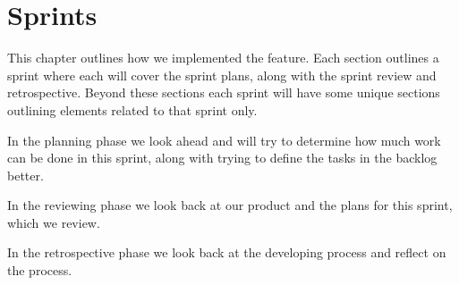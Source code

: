 \chapter{Sprints}
This chapter outlines how we implemented the feature. Each section outlines a sprint where each will cover the sprint plans, along with the sprint review and retrospective. Beyond these sections each sprint will have some unique sections outlining elements related to that sprint only.

In the planning phase we look ahead and will try to determine how much work can be done in this sprint, along with trying to define the tasks in the backlog better.

In the reviewing phase we look back at our product and the plans for this sprint, which we review.

In the retrospective phase we look back at the developing process and reflect on the process.







